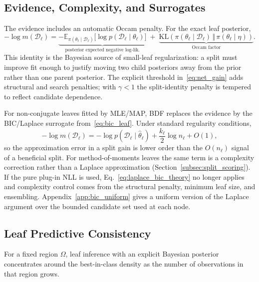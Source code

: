 \documentclass[10pt]{article} %
\begin{document}
\subsection{Evidence, Complexity, and Surrogates}
\label{subsec:theory_occam}
\label{subsec:theory_surrogates}

The evidence includes an automatic Occam penalty. For the exact leaf posterior,
\begin{equation}\label{eq:evidence_decomposition}
-\log m(\mathcal{D}_\ell)
=
\underbrace{-\mathbb{E}_{\pi(\theta_\ell\mid \mathcal{D}_\ell)}
\big[\log p(\mathcal{D}_\ell\mid \theta_\ell)\big]}_{\text{posterior expected negative log-lik.}}
\;+\;
\underbrace{\mathrm{KL}\!\left(\pi(\theta_\ell\mid \mathcal{D}_\ell)\,\Vert\,\pi(\theta_\ell\mid\eta)\right)}_{\text{Occam factor}}.
\end{equation}
This identity is the Bayesian source of small-leaf regularization: a split must improve fit enough to justify moving two child posteriors away from the prior rather than one parent posterior. The explicit threshold in~\eqref{eq:net_gain} adds structural and search penalties; with $\gamma<1$ the split-identity penalty is tempered to reflect candidate dependence.

For non-conjugate leaves fitted by MLE/MAP, BDF replaces the evidence by the BIC/Laplace surrogate from~\eqref{eq:bic_leaf}. Under standard regularity conditions,
\begin{equation}\label{eq:laplace_bic_theory}
-\log m(\mathcal{D}_\ell)
=
-\log p(\mathcal{D}_\ell\mid \hat{\theta}_\ell)
+
\frac{k_\ell}{2}\log n_\ell
+
O(1),
\end{equation}
so the approximation error in a split gain is lower order than the $O(n_\ell)$ signal of a beneficial split. For method-of-moments leaves the same term is a complexity correction rather than a Laplace approximation (Section~\ref{subsec:split_scoring}). If the pure plug-in NLL is used, Eq.~\eqref{eq:laplace_bic_theory} no longer applies and complexity control comes from the structural penalty, minimum leaf size, and ensembling.
Appendix~\ref{app:bic_uniform} gives a uniform version of the Laplace argument over the bounded candidate set used at each node.

\subsection{Leaf Predictive Consistency}\label{subsec:theory_leaf_consistency}

For a fixed region $\Omega$, leaf inference with an explicit Bayesian posterior concentrates around the best-in-class density as the number of observations in that region grows.
\end{document}
